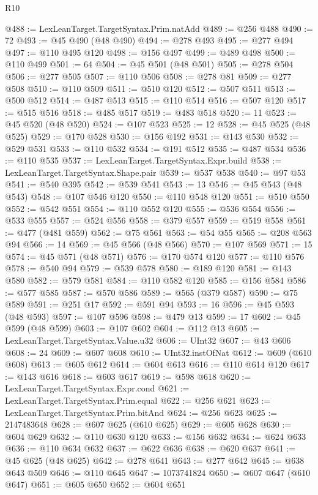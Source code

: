 \begin{lexlean}{R10}
\begin{coremodule}
@488 := LexLeanTarget.TargetSyntax.Prim.natAdd
@489 := @256 @488
@490 := 72
@493 := @45 @490 (@48 @490)
@494 := @278 @493
@495 := @277 @494
@497 := @110 @495 @120
@498 := @156 @497
@499 := @489 @498
@500 := @110 @499
@501 := 64
@504 := @45 @501 (@48 @501)
@505 := @278 @504
@506 := @277 @505
@507 := @110 @506
@508 := @278 @81
@509 := @277 @508
@510 := @110 @509
@511 := @510 @120
@512 := @507 @511
@513 := @500 @512
@514 := @487 @513
@515 := @110 @514
@516 := @507 @120
@517 := @515 @516
@518 := @485 @517
@519 := @483 @518
@520 := 11
@523 := @45 @520 (@48 @520)
@524 := @107 @523
@525 := 12
@528 := @45 @525 (@48 @525)
@529 := @170 @528
@530 := @156 @192
@531 := @143 @530
@532 := @529 @531
@533 := @110 @532
@534 := @191 @512
@535 := @487 @534
@536 := @110 @535
@537 := LexLeanTarget.TargetSyntax.Expr.build
@538 := LexLeanTarget.TargetSyntax.Shape.pair
@539 := @537 @538
@540 := @97 @53
@541 := @540 @395
@542 := @539 @541
@543 := 13
@546 := @45 @543 (@48 @543)
@548 := @107 @546 @120
@550 := @110 @548 @120
@551 := @510 @550
@552 := @542 @551
@554 := @110 @552 @120
@555 := @536 @554
@556 := @533 @555
@557 := @524 @556
@558 := @379 @557
@559 := @519 @558
@561 := @477 (@481 @559)
@562 := @75 @561
@563 := @54 @55
@565 := @208 @563 @94
@566 := 14
@569 := @45 @566 (@48 @566)
@570 := @107 @569
@571 := 15
@574 := @45 @571 (@48 @571)
@576 := @170 @574 @120
@577 := @110 @576
@578 := @540 @94
@579 := @539 @578
@580 := @189 @120
@581 := @143 @580
@582 := @579 @581
@584 := @110 @582 @120
@585 := @156 @584
@586 := @577 @585
@587 := @570 @586
@589 := @565 (@379 @587)
@590 := @75 @589
@591 := @251 @17
@592 := @591 @94
@593 := 16
@596 := @45 @593 (@48 @593)
@597 := @107 @596
@598 := @479 @13
@599 := 17
@602 := @45 @599 (@48 @599)
@603 := @107 @602
@604 := @112 @13
@605 := LexLeanTarget.TargetSyntax.Value.u32
@606 := UInt32
@607 := @43 @606
@608 := 24
@609 := @607 @608
@610 := UInt32.instOfNat
@612 := @609 (@610 @608)
@613 := @605 @612
@614 := @604 @613
@616 := @110 @614 @120
@617 := @143 @616
@618 := @603 @617
@619 := @598 @618
@620 := LexLeanTarget.TargetSyntax.Expr.cond
@621 := LexLeanTarget.TargetSyntax.Prim.equal
@622 := @256 @621
@623 := LexLeanTarget.TargetSyntax.Prim.bitAnd
@624 := @256 @623
@625 := 2147483648
@628 := @607 @625 (@610 @625)
@629 := @605 @628
@630 := @604 @629
@632 := @110 @630 @120
@633 := @156 @632
@634 := @624 @633
@636 := @110 @634 @632
@637 := @622 @636
@638 := @620 @637
@641 := @45 @625 (@48 @625)
@642 := @278 @641
@643 := @277 @642
@645 := @638 @643 @509
@646 := @110 @645
@647 := 1073741824
@650 := @607 @647 (@610 @647)
@651 := @605 @650
@652 := @604 @651

\end{coremodule}
\end{lexlean}
